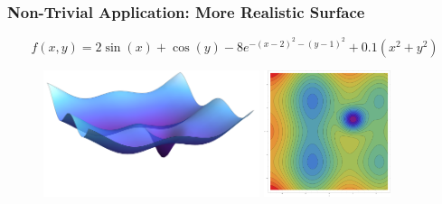 \documentclass{beamer}
\begin{document}
\begin{frame}
\frametitle{Non-Trivial Application: More Realistic Surface}


$$f(x,y)=2\sin(x)+\cos(y)-8e^{-(x-2)^2-(y-1)^2}+0.1(x^2+y^2)$$


\begin{figure}
\includegraphics[height=3.7cm]{landscape}
\includegraphics[height=3.7cm]{landscape_levelset}
\end{figure}


\end{frame}
\end{document}
